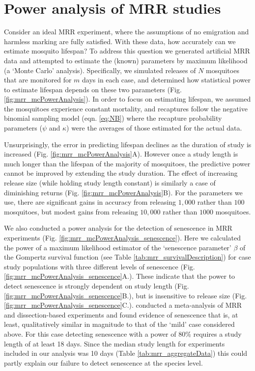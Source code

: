 \documentclass[12pt]{article}
\begin{document}
\section{Power analysis of MRR studies}
Consider an ideal MRR experiment, where the assumptions of no emigration and harmless marking are fully satisfied. With these data, how accurately can we estimate mosquito lifespan? To address this question we generated artificial MRR data and attempted to estimate the (known) parameters by maximum likelihood (a `Monte Carlo' analysis). Specifically, we simulated releases of $N$ mosquitoes that are monitored for $m$ days in each case, and determined how statistical power to estimate lifespan depends on these two parameters (Fig. \ref{fig:mrr_mcPowerAnalysis}). In order to focus on estimating lifespan, we assumed the mosquitoes experience constant mortality, and recaptures follow the negative binomial sampling model (eqn. \ref{eq:NB}) where the recapture probability parameters ($\psi$ and $\kappa$) were the averages of those estimated for the actual data.

Unsurprisingly, the error in predicting lifespan declines as the duration of study is increased (Fig. \ref{fig:mrr_mcPowerAnalysis}A). However once a study length is much longer than the lifespan of the majority of mosquitoes, the predictive power cannot be improved by extending the study duration. The effect of increasing release size (while holding study length constant) is similarly a case of diminishing returns (Fig. \ref{fig:mrr_mcPowerAnalysis}B). For the parameters we use, there are significant gains in accuracy from releasing $1,000$ rather than $100$ mosquitoes, but modest gains from releasing $10,000$ rather than $1000$ mosquitoes.

We also conducted a power analysis for the detection of senescence in MRR experiments (Fig. \ref{fig:mrr_mcPowerAnalysis_senescence}). Here we calculated the power of a maximum likelihood estimator of the `senescence parameter' $\beta$ of the Gompertz survival function (see Table \ref{tab:mrr_survivalDescription}) for case study populations with three different levels of senescence (Fig. \ref{fig:mrr_mcPowerAnalysis_senescence}A.). These indicate that the power to detect senescence is strongly dependent on study length (Fig. \ref{fig:mrr_mcPowerAnalysis_senescence}B.), but is insensitive to release size (Fig. \ref{fig:mrr_mcPowerAnalysis_senescence}C.). \cite{clements1981analysis} conducted a meta-analysis of MRR and dissection-based experiments and found evidence of senescence that is, at least, qualitatively similar in magnitude to that of the `mild' case considered above. For this case detecting senescence with a power of 80\% requires a study length of at least 18 days. Since the median study length for experiments included in our analysis was 10 days (Table \ref{tab:mrr_aggregateData}) this could partly explain our failure to detect senescence at the species level.
\end{document}
